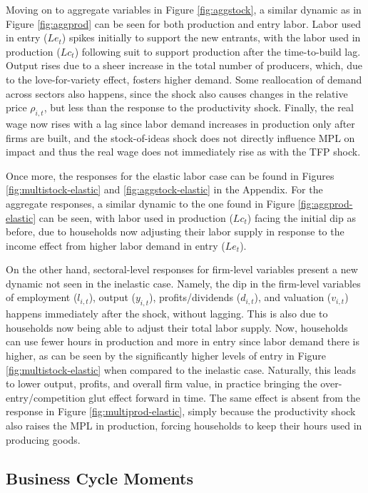 \documentclass[a4paper,12pt]{article} %
\numberwithin{equation}{section} %
\numberwithin{figure}{section}
\numberwithin{table}{section}
\begin{document}
Moving on to aggregate variables in Figure \ref{fig:aggstock}, a similar dynamic as in Figure \ref{fig:aggprod} can be seen for both 
production and entry labor. Labor used in entry ($Le_t$) spikes initially to support the new entrants, with the labor used in production ($Lc_t$)
following suit to support production after the time-to-build lag. Output rises due to a sheer increase in the total number of producers, which,
due to the love-for-variety effect, fosters higher demand. Some reallocation of demand across sectors also happens, since the shock also causes
changes in the relative price $\rho_{i,t}$, but less than the response to the productivity shock. Finally, the real wage now rises with a lag since
labor demand increases in production only after firms are built, and the stock-of-ideas shock does not directly influence MPL on impact and thus the 
real wage does not immediately rise as with the TFP shock.

Once more, the responses for the elastic labor case can be found in Figures \ref{fig:multistock-elastic} and \ref{fig:aggstock-elastic} 
in the Appendix.
For the aggregate responses, a similar dynamic to the one found in Figure \ref{fig:aggprod-elastic} can be seen, with labor used in 
production ($Lc_t$) facing the initial dip as before, due to households now adjusting their labor supply in response to the income effect 
from higher labor demand in entry ($Le_t$).

On the other hand, sectoral-level responses for firm-level variables present a new dynamic not seen in the inelastic case. Namely, the dip in the
firm-level variables of employment ($l_{i,t}$), output ($y_{i,t}$), profits/dividends ($d_{i,t}$), and valuation ($v_{i,t}$) happens immediately after the shock,
without lagging. This is also due to households now being able to adjust their total labor supply. Now, households can use fewer hours in production
and more in entry since labor demand there is higher, as can be seen by the significantly higher levels of entry in Figure \ref{fig:multistock-elastic}
when compared to the inelastic case. Naturally, this leads to lower output, profits, and overall firm value, in practice bringing the 
over-entry/competition glut effect forward in time. The same effect is absent from the response in Figure \ref{fig:multiprod-elastic}, simply because
the productivity shock also raises the MPL in production, forcing households to keep their hours used in producing goods. 


\subsection{Business Cycle Moments}
\label{sec:quant-BCmon}
\end{document}
